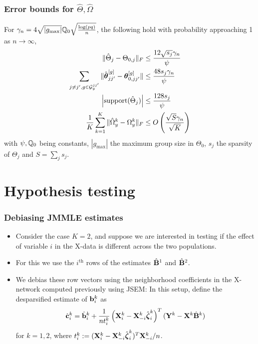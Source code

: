 \documentclass[10pt]{beamer}
\theoremstyle{definition}
\begin{document}
\begin{frame}
\frametitle{Error bounds for $\hat \Theta, \hat\Omega$}

For $\gamma_n = 4 \sqrt{| g_{\max}|} {\mathbb{Q}}_0 \sqrt{ \frac{ \log(pq)}{n}}$, the following hold with probability approaching 1 as $n \rightarrow \infty$,
%
\begin{align*}
\| \hat \Theta_j - \Theta_{0,j} \|_F & \leq \frac{12 \sqrt{s_j} \gamma_n}{\psi} \\
\sum_{j \neq j', g \in {\cal{G}}_y^{jj'}} \| \hat {{\boldsymbol{\theta}}}_{jj'}^{[g]} - {\boldsymbol{\theta}}_{0,jj'}^{[g]} \| & \leq \frac{48 s_j \gamma_n}{\psi} \\
\left| \text{support} (\hat \Theta_j) \right| & \leq
\frac{128 s_j}{ \psi}\\
\frac{1}{K} \sum_{k=1}^K \| \hat \Omega_y^k - \Omega_y^k \|_F & \leq
O \left( \frac{\sqrt S \gamma_n }{\sqrt K} \right)\\
\end{align*}
%
with $\psi, {\mathbb{Q}}_0$ being constants, $| g_{\max} |$ the maximum group size in $\Theta_0$, $s_j$ the sparsity of $\Theta_j$ and $S = \sum_j s_j$.
\end{frame}

\section{Hypothesis testing}
\begin{frame}
\frametitle{Debiasing JMMLE estimates}

\begin{itemize}
\item Consider the case $K=2$, and suppose we are interested in testing if the effect of variable $i$ in the X-data is different across the two populations.
\vspace{1em}

\item For this we use the $i^{\text{th}}$ rows of the estimates $\hat {{\mathbf{B}}}^1$ and $\hat {{\mathbf{B}}}^2$.
\vspace{1em}

\item We debias these row vectors using the neighborhood coefficients in the X-network computed previously using JSEM:
%
In this setup, define the desparsified estimate of ${\bf{b}}_i^k$ as
%
\begin{align*}
\hat {{\bf{c}}}_i^k = \hat {{\bf{b}}}_i^k + \frac{1}{n t_i^k} \left( {\mathbf{X}}_i^k - {\mathbf{X}}_{-i}^k \hat {{\boldsymbol{\zeta}}}_i^k \right)^T
({\mathbf{Y}}^k - {\mathbf{X}}^k \hat {{\mathbf{B}}}^k )
\end{align*}
%
for $k = 1,2$, where $t_i^k := ( {\mathbf{X}}_i^k - {\mathbf{X}}_{-i}^k \hat {{\boldsymbol{\zeta}}}_i^k )^T {\mathbf{X}}_{-i}^k/n$.
\end{itemize}

\end{frame}
\end{document}
